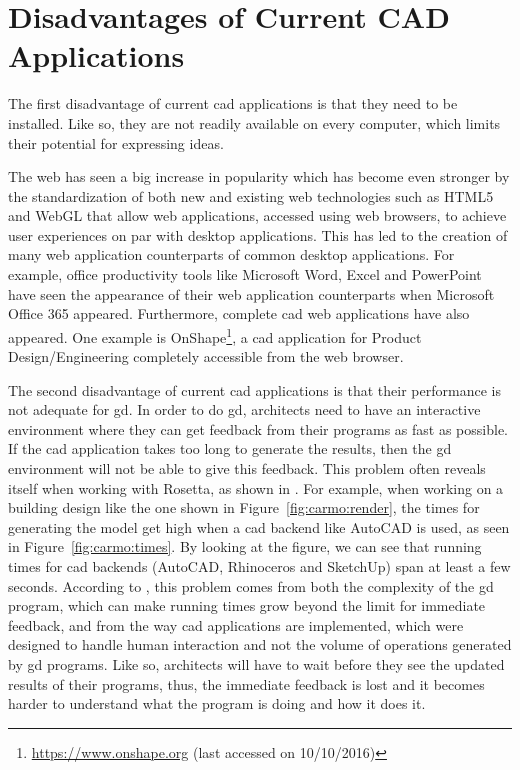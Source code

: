 \section{Disadvantages of Current CAD Applications}
The first disadvantage of current \gls{cad} applications is that they need to be installed.
Like so, they are not readily available on every computer, which limits their potential for expressing ideas.

The web has seen a big increase in popularity which has become even stronger by the standardization of both new and existing web technologies such as HTML5\cite{hickson2011html5} and WebGL\cite{marrin2011webgl} that allow web applications, accessed using web browsers, to achieve user experiences on par with desktop applications.
This has led to the creation of many web application counterparts of common desktop applications.
For example, office productivity tools like Microsoft Word, Excel and PowerPoint have seen the appearance of their web application counterparts when Microsoft Office 365 appeared.
Furthermore, complete \gls{cad} web applications have also appeared.
One example is OnShape\footnote{\url{https://www.onshape.org} (last accessed on 10/10/2016)}, a \gls{cad} application for Product Design/Engineering completely accessible from the web browser.

The second disadvantage of current \gls{cad} applications is that their performance is not adequate for \gls{gd}.
In order to do \gls{gd}, architects need to have an interactive environment where they can get feedback from their programs as fast as possible.
If the \gls{cad} application takes too long to generate the results, then the \gls{gd} environment will not be able to give this feedback.
This problem often reveals itself when working with Rosetta, as shown in \cite{Leitao2014illustrated}.
For example, when working on a building design like the one shown in Figure~\ref{fig:carmo:render}, the times for generating the model get high when a \gls{cad} backend like AutoCAD is used, as seen in Figure~\ref{fig:carmo:times}.
By looking at the figure, we can see that running times for \gls{cad} backends (AutoCAD, Rhinoceros and SketchUp) span at least a few seconds.
According to \cite{Leitao2014illustrated}, this problem comes from both the complexity of the \gls{gd} program, which can make running times grow beyond the limit for immediate feedback, and from the way \gls{cad} applications are implemented, which were designed to handle human interaction and not the volume of operations generated by \gls{gd} programs.
Like so, architects will have to wait before they see the updated results of their programs, thus, the immediate feedback is lost and it becomes harder to understand what the program is doing and how it does it.

